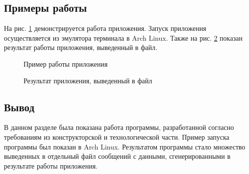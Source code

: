 \documentclass[a4paper,12pt]{article}
\begin{document}
\subsection{Примеры работы}
На рис. \ref{images:example1} демонстрируется работа приложения. Запуск приложения осуществляется из эмулятора терминала в Arch Linux. Также на рис. \ref{images:example2} показан результат работы приложения, выведенный в файл. 
\begin{figure}[h]
\caption{Пример работы приложения}
\label{images:example1}
\end{figure}
\begin{figure}[H]
\caption{Результат приложения, выведенный в файл}
\label{images:example2}
\end{figure}

\newpage
\subsection{Вывод}
В данном разделе была показана работа программы, разработанной согласно требованиям из конструкторской и технологической части. Пример запуска программы 
был показан в Arch Linux. Результатом программы стало множество выведенных в отдельный файл сообщений с данными, сгенерированными в результате работы приложения.
\end{document}
